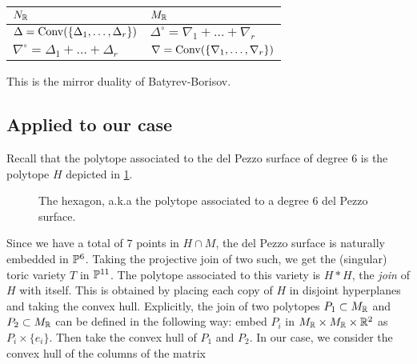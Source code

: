 \documentclass[11pt, english]{article}
\begin{document}
\begin{center}
\begin{tabular}{l l}
  $N_{\mathbb{R}}$ & $M_{\mathbb{R}}$ \\
\hline
 $\Delta=\operatorname{Conv}(\{\Delta_1,\ldots,\Delta_r\})$ & $\Delta^\circ=\nabla_1+\ldots+\nabla_r$ \\
$\nabla^\circ = \Delta_1+\ldots+\Delta_r$ & $\nabla=\operatorname{Conv}(\{\nabla_1,\ldots,\nabla_r\})$ \\

\end{tabular}
\end{center}

This is the mirror duality of Batyrev-Borisov.

\subsection{Applied to our case}

Recall that the polytope associated to the del Pezzo surface of degree $6$ is the polytope $H$ depicted in \ref{fig:hexagon}. 

\begin{figure}[ht]
\label{fig:hexagon}
\centering
{}
\caption{The hexagon, a.k.a the polytope associated to a degree 6 del Pezzo surface.}
\end{figure}
 
Since we have a total of $7$ points in $H \cap M$, the del Pezzo surface is naturally embedded in $\mathbb{P}^6$. Taking the projective join of two such, we get the (singular) toric variety $T$ in $\mathbb{P}^{11}$. The polytope associated to this variety is $H \ast H$, the \emph{join} of $H$ with itself. This is obtained by placing each copy of $H$ in disjoint hyperplanes and taking the convex hull. Explicitly, the join of two polytopes $P_1 \subset M_{\mathbb{R}}$ and $P_2 \subset M_{\mathbb{R}}$ can be defined in the following way: embed $P_i$ in $M_{\mathbb{R}} \times M_{\mathbb{R}} \times \mathbb{R}^2$ as $P_i \times \{e_i\}$. Then take the convex hull of $P_1$ and $P_2$. In our case, we consider the convex hull of the columns of the  matrix
\end{document}

